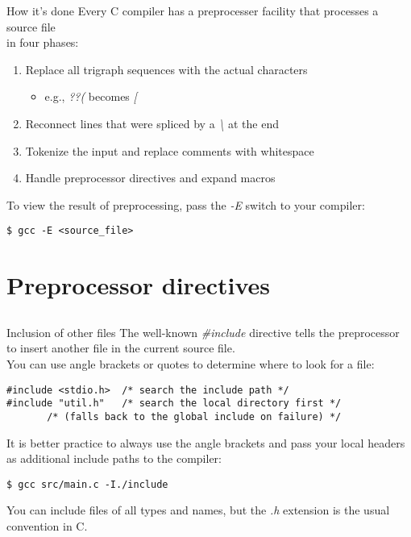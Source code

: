 \begin{frame}[fragile = singleslide]{How it's done}
	Every C compiler has a preprocesser facility that processes a source file\\
	in four phases:\\
	\begin{enumerate}
		\item Replace all trigraph sequences with the actual characters
		\begin{itemize}
			\item e.g., \textit{??(} becomes \textit{[}
		\end{itemize}
		\item Reconnect lines that were spliced by a \textit{\textbackslash} at the end
		\item Tokenize the input and replace comments with whitespace
		\item Handle preprocessor directives and expand macros
	\end{enumerate}
	\bigskip
	To view the result of preprocessing, pass the \textit{-E} switch to your compiler:
	\begin{lstlisting}[numbers=none]
$ gcc -E <source_file>
\end{lstlisting}
\end{frame}

\section{Preprocessor directives}
\subsection{}

\begin{frame}[fragile = singleslide]{Inclusion of other files}
	The well-known \textit{\#include} directive tells the preprocessor to insert
	another file in the current source file.\\
	\bigskip
	You can use angle brackets or quotes to determine where to look for a file:
	\begin{lstlisting}[numbers=none]
#include <stdio.h>	/* search the include path */
#include "util.h"	/* search the local directory first */
	   /* (falls back to the global include on failure) */
\end{lstlisting}
	It is better practice to always use the angle brackets and pass your local
	headers as additional include paths to the compiler:
	\begin{lstlisting}[numbers=none]
$ gcc src/main.c -I./include
\end{lstlisting}
	\bigskip
	You can include files of all types and names, but the \textit{.h} extension
	is the usual convention in C.
\end{frame}

